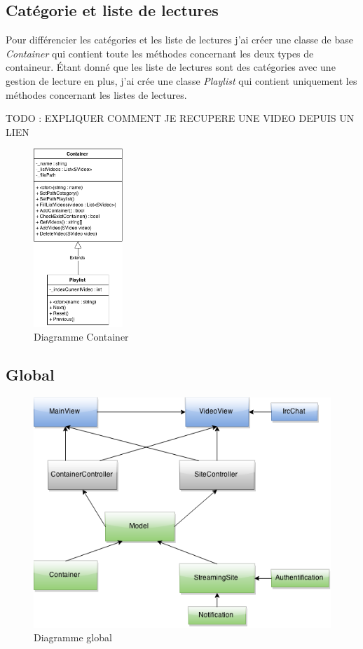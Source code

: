 \documentclass[11pt]{report} %
\begin{document}
			\subsection{Catégorie et liste de lectures}
			Pour différencier les catégories et les liste de lectures j'ai créer une classe de base \textit{Container} qui contient toute les méthodes concernant les deux types de containeur.
			Étant donné que les liste de lectures sont des catégories avec une gestion de lecture en plus, j'ai crée une classe \textit{Playlist} qui contient uniquement les méthodes concernant les listes de lectures.
			
			TODO : EXPLIQUER COMMENT JE RECUPERE UNE VIDEO DEPUIS UN LIEN
			
			\begin{figure}[h]
				\center
				\includegraphics[width=0.3\textwidth]{../img/Container.png}
				\caption{Diagramme Container}
				\label{Container}
			\end{figure}
		
		
	\subsection{Global}
	
		\begin{figure}[h]
			\center
			\includegraphics[width=1\textwidth]{../img/Model.png}
			\caption{Diagramme global}
			\label{Global}
		\end{figure}
			
\end{document}
